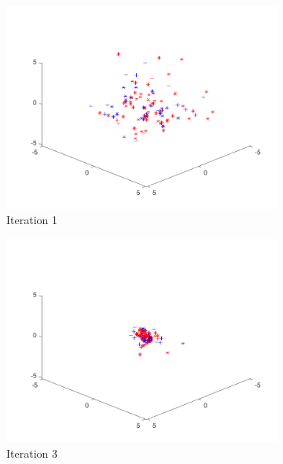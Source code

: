 \begin{figure}
  \begin{subfigure}[b]{0.4\textwidth}
    \includegraphics[width=\textwidth]{img/smpl/fn4d/loa-iter-1}
    \caption{Iteration 1}
    \label{fig:s3-iter-0}
  \end{subfigure}
  \begin{subfigure}[b]{0.4\textwidth}
    \includegraphics[width=\textwidth]{img/smpl/fn4d/loa-iter-3}
    \caption{Iteration 3}
    \label{fig:s3-iter-1}
  \end{subfigure}
  \begin{subfigure}[b]{0.4\textwidth}

\end{subfigure}
\end{figure}
